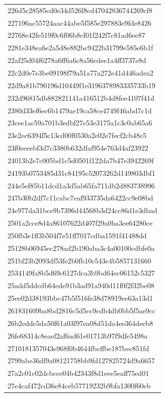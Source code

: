 \begin{tabular}{l}
226d5c28585cd0e34d526f8cd47042836744269cf8 \\
227196ac55724aac44abe5f585e297883e9fde8426 \\
22768e42fe519f0c6f06b8cf01f242f7c81ad6ee87 \\
2281e348ea6e2a5d8e882bc9422b31799e585e6b1f \\
22af25d04f6278a6ff6a6c8a56cdee1a4ff3737e8d \\
22c2d0e7e3be09198f79a51a77a272e41d446adea2 \\
22d9a81b790196d10449f1e3196378983335733b19 \\
232d96815db882821141a416512b4d8fee4107f41d \\
2380d33ef6ec6b1479ae19ca58ce4749f46abd7c1d \\
23cee1ac59a701b3edbf27e53e3175a1c3c0ab65a6 \\
23e2ec6394f5c13cd00f0530a2e02e7fecf2cb48c5 \\
23f0eeeebf3d7c3380b632dfaf954e763d4af23922 \\
24013b2e7c005bd1c5d0501f122da7b47e3942269f \\
24193b0753485d31c84195c52073262d149803dbf1 \\
244e5ef85b11dcd1a3d5ab65fa711db2d883738996 \\
247b30b2df7c11cabc7eaf933735da6422cc9e08bd \\
24e977da31bce9b7396d44568b3d24cc86d1e3dbad \\
2501a2cce8d4a86107622d407f29a0ba3ee64280ce \\
250fb3e1ff3b504f7e51ff7017cdba1591f41488dd \\
25128b06945ec278ad2b190aba3c4a00100cdbfe0a \\
251bf23b2093df53fe2b0fb10c543e4b5857131660 \\
2534149fa8b5d69c6127dca3b9bd64ec06152c5327 \\
25add5ddcdb64ede91b3ad91a940d11f0f2f32be08 \\
25ee02d38193bbc47b5f516fe38d78919ee63a13d1 \\
261831609ba8bd2816c5d5cc9cdb4db0bb5f5ae9cc \\
26b2edde5da50f61a03f97ea08d51da4ee364deeb8 \\
26fe68314c8eaef2af6ad61e01713b97f9dfe5498a \\
2710181357043e968f0b4644fbcffbe187bec851fd \\
2799abe36df9a08121758bb9fd127825724d9a6657 \\
27a2c01c02dcbcce04b42343f8d1eee5eaff75ed01 \\
27e4caf472cd36e84ceb57719232b9bfa1300f60eb \\

\end{tabular}
